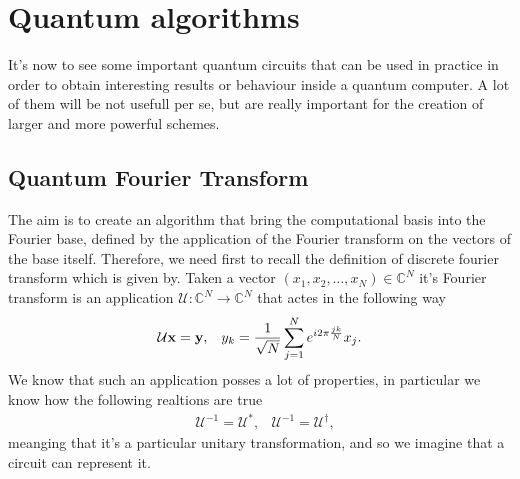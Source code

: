 \section{Quantum algorithms}

It's now to see some important quantum circuits that can be used in practice in order to obtain interesting results or behaviour inside a quantum computer. A lot of them will be not usefull per se, but are really important for the creation of larger and more powerful schemes.

\subsection{Quantum Fourier Transform}

The aim is to create an algorithm that bring the computational basis into the Fourier base, defined by the application of the Fourier transform on the vectors of the base itself. Therefore, we need first to recall the definition of discrete fourier transform which is given by.
{
    Taken a vector $(x_1, x_2, \dots, x_N)\in \mathbb{C}^N$ it's Fourier transform is an application $\mathcal{U}: \mathbb{C}^N \to \mathbb{C}^N$ that actes in the following way
    \begin{align}
        &\mathcal{U}\vb{x} = \vb{y}, &y_k = \frac{1}{\sqrt{N}} \sum_{j=1}^N e^{i2\pi \frac{jk}{N}}x_j.
    \end{align} 
}
\noindent
We know that such an application posses a lot of properties, in particular we know how the following realtions are true
\begin{align}
    \label{eq:DiscrFourTrans}
    &\mathcal{U}^{-1} = \mathcal{U}^*, &\mathcal{U}^{-1} = \mathcal{U}^\dagger,
\end{align}
meanging that it's a particular unitary transformation, and so we imagine that a circuit can represent it.

